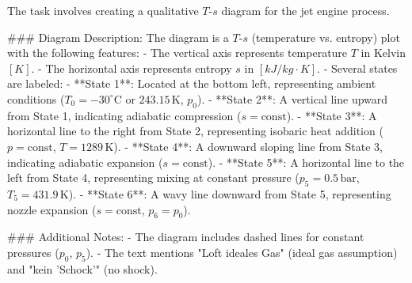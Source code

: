 The task involves creating a qualitative \( T \)-\( s \) diagram for the jet engine process.  

### Diagram Description:  
The diagram is a \( T \)-\( s \) (temperature vs. entropy) plot with the following features:  
- The vertical axis represents temperature \( T \) in Kelvin \([K]\).  
- The horizontal axis represents entropy \( s \) in \([kJ/kg·K]\).  
- Several states are labeled:  
  - **State 1**: Located at the bottom left, representing ambient conditions (\( T_0 = -30^\circ\text{C} \) or \( 243.15 \, \text{K} \), \( p_0 \)).  
  - **State 2**: A vertical line upward from State 1, indicating adiabatic compression (\( s = \text{const} \)).  
  - **State 3**: A horizontal line to the right from State 2, representing isobaric heat addition (\( p = \text{const} \), \( T = 1289 \, \text{K} \)).  
  - **State 4**: A downward sloping line from State 3, indicating adiabatic expansion (\( s = \text{const} \)).  
  - **State 5**: A horizontal line to the left from State 4, representing mixing at constant pressure (\( p_5 = 0.5 \, \text{bar} \), \( T_5 = 431.9 \, \text{K} \)).  
  - **State 6**: A wavy line downward from State 5, representing nozzle expansion (\( s = \text{const} \), \( p_6 = p_0 \)).  

### Additional Notes:  
- The diagram includes dashed lines for constant pressures (\( p_0 \), \( p_5 \)).  
- The text mentions "Loft ideales Gas" (ideal gas assumption) and "kein 'Schock'" (no shock).